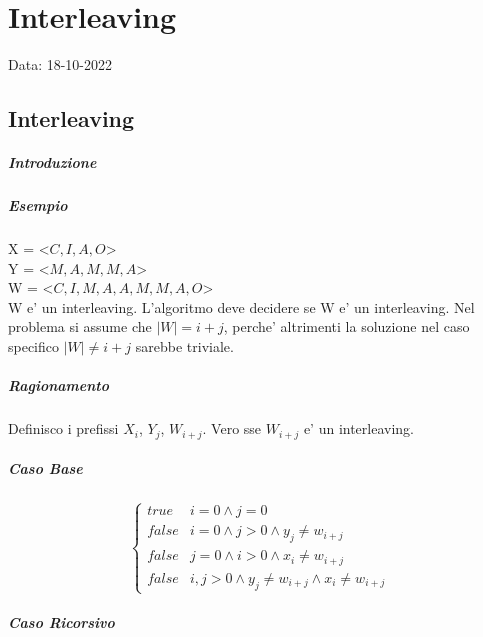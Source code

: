 \chapter{Interleaving}
Data: 18-10-2022

\section{Interleaving}

\paragraph{Introduzione}

\paragraph{Esempio}

X = <$C, I, A, O$>\\
Y = <$M, A, M, M, A$>\\
W = <$C, I, M, A, A, M, M, A, O$>\\

W e' un interleaving. L'algoritmo deve decidere se W e' un interleaving.
Nel problema si assume che $|W| = i+j$, perche' altrimenti la soluzione nel caso specifico $|W| \ne i+j$ sarebbe triviale.

\paragraph{Ragionamento}

Definisco i prefissi $X_i$, $Y_j$, $W_{i+j}$.
Vero sse $W_{i+j}$ e' un interleaving.

\paragraph{Caso Base}

\[
    \begin{cases}
        \text{$true$} & \text{$i = 0 \land j = 0$} \\
        \text{$false$} & \text{$i = 0 \land j > 0 \land y_j \ne w_{i+j}$} \\
        \text{$false$} & \text{$j = 0 \land i > 0 \land x_i \ne w_{i+j}$} \\
        \text{$false$} & \text{$i, j > 0 \land y_j \ne w_{i+j} \land x_i \ne w_{i+j}$}
    \end{cases}
\]

\paragraph{Caso Ricorsivo}

